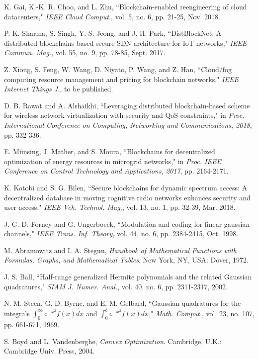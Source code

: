 \documentclass[journal]{IEEEtran}
\begin{document}
\begin{thebibliography}{1}
 K. Gai, K.-K. R. Choo, and L. Zhu, ``Blockchain-enabled reengineering of cloud datacenters," \emph{IEEE Cloud Comput.}, vol. 5, no. 6, pp. 21-25, Nov. 2018.

 P. K. Sharma, S. Singh, Y. S. Jeong, and J. H. Park, ``DistBlockNet: A distributed blockchains-based secure SDN architecture for IoT networks," \emph{IEEE Commun. Mag.}, vol. 55, no. 9, pp. 78-85, Sept. 2017.

 Z. Xiong, S. Feng, W. Wang, D. Niyato, P. Wang, and Z. Han, ``Cloud/fog computing resource management and pricing for blockchain networks," \emph{IEEE Internet Things J.}, to be published.

 D. B. Rawat and A. Alshaikhi, ``Leveraging distributed blockchain-based scheme for wireless network virtualization with security and QoS constraints," in \emph{Proc. International Conference on Computing, Networking and Communications, 2018}, pp. 332-336.

 E. M\"{u}nsing, J. Mather, and S. Moura, ``Blockchains for decentralized optimization of energy resources in microgrid networks," in \emph{Proc. IEEE Conference on Control Technology and Applications, 2017}, pp. 2164-2171.

 K. Kotobi and S. G. Bilen, ``Secure blockchains for dynamic spectrum access: A decentralized database in moving cognitive radio networks enhances security and user access," \emph{IEEE Veh. Technol. Mag.}, vol. 13, no. 1, pp. 32-39, Mar. 2018.
	
 J. G. D. Forney and G. Ungerboeck, ``Modulation and coding for linear gaussian channels," \emph{IEEE Trans. Inf. Theory}, vol. 44, no. 6, pp. 2384-2415, Oct. 1998.

 M. Abramowitz and I. A. Stegun, \emph{Handbook of Mathematical Functions with Formulas, Graphs, and Mathematical Tables}. New York, NY, USA: Dover, 1972.

 J. S. Ball, ``Half-range generalized Hermite polynomials and the related Gaussian quadratures," \emph{SIAM J. Numer. Anal.}, vol. 40, no. 6, pp. 2311-2317, 2002.

 N. M. Steen, G. D. Byrne, and E. M. Gelbard, ``Gaussian quadratures for the integrals $\int_{0}^{\infty} e^{-x^2}f\left(x\right) dx$ and $\int_{0}^{b}e^{-x^2}f\left(x\right)dx$," \emph{Math. Comput.}, vol. 23, no. 107, pp. 661-671, 1969.
    
 S. Boyd and L. Vandenberghe, \emph{Convex Optimization}. Cambridge, U.K.: Cambridge Univ. Press, 2004.


\end{thebibliography}
\end{document}
